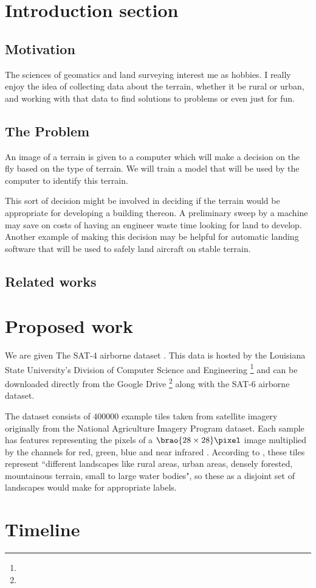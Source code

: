 \documentclass[11pt]{article}
\DeclarePairedDelimiter\brao()%
\begin{document}
\section{Introduction section}

\subsection{Motivation}

The sciences of geomatics and land surveying interest me as hobbies.
I really enjoy the idea of collecting data about the terrain,
whether it be rural or urban,
and working with that data to find solutions to problems
or even just for fun.

\subsection{The Problem}

An image of a terrain is given to a computer which will make a decision on the fly based on the type of terrain.
We will train a model that will be used by the computer to identify this terrain.

This sort of decision might be involved in deciding if the terrain would be appropriate for developing a building thereon.
A preliminary sweep by a machine may save on costs of having an engineer waste time looking for land to develop.
Another example of making this decision may be helpful for automatic landing software that will be used to safely land aircraft on stable terrain.

\subsection{Related works}

\section{Proposed work}

We are given
The SAT-4 airborne dataset%
\cite{Basu2015a}.
This data is hosted by the Louisiana State University's Division of Computer Science and Engineering%
\footnote{%
}
and can be downloaded directly from the Google Drive%
\footnote{%
}
along with the SAT-6 airborne dataset.

The dataset consists of \(\num{400000}\) example tiles
taken from satellite imagery originally from the National Agriculture Imagery Program  dataset.
Each sample has features representing the pixels of a \(\SI[parse-numbers=false]{\brao{28\times28}\!}\pixel\) image 
multiplied by the channels for red, green, blue and near infrared .
According to \textcite{Basu2015a},
these tiles represent ``different landscapes like rural areas, urban areas, densely forested, mountainous terrain, small to large water bodies",
so these as a disjoint set of landscapes would make for appropriate labels.

\section{Timeline}

\printbibliography
\end{document}
